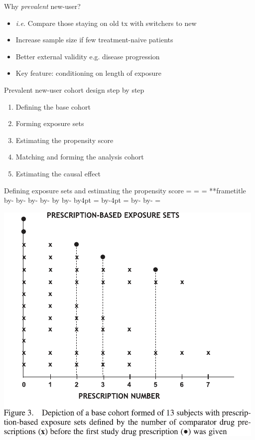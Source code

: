 \documentclass[aspectratio=169,12pt]{beamer} %
\makeatletter
\newif\ifsidebartheme
\newcommand*{\calculatespace}{%
    \contentheight=\paperheight%
    \ifx\beamer@frametitle\@empty%
        \setbox\@tempboxa=\box\voidb@x%
      \else%
        \setbox\@tempboxa=\vbox{%
          \vbox{}%
          {\parskip0pt\usebeamertemplate***{frametitle}}%
        }%
        \ifsidebartheme%
          \advance\contentheight by-1em%
        \fi%
      \fi%
    \advance\contentheight by-\ht\@tempboxa%
    \advance\contentheight by-\dp\@tempboxa%
    \advance\contentheight by-\beamer@frametopskip%
    \ifbeamer@plainframe%
    \contentbottom=0pt%
    \else%
    \advance\contentheight by-\headheight%
    \advance\contentheight by\headdp%
    \advance\contentheight by-\footheight%
    \advance\contentheight by4pt%
    \contentbottom=\footheight%
    \advance\contentbottom by-4pt%
    \fi%
    \contentwidth=\paperwidth%
    \ifbeamer@plainframe%
    \contentleft=0pt%
    \else%
    \advance\contentwidth by-\beamer@rightsidebar%
    \advance\contentwidth by-\beamer@leftsidebar\relax%
    \contentleft=\beamer@leftsidebar%
    \fi%
}
\makeatother
\begin{document}
\begin{frame}{Why \emph{prevalent} new-user?}
    \begin{itemize}
	\item \emph{i.e.} Compare those staying on old tx with switchers to new
	\item Increase sample size if few treatment-naive patients
	\item Better external validity e.g. disease progression
	\item Key feature: conditioning on length of exposure
    \end{itemize}
\end{frame}

\begin{frame}{Prevalent new-user cohort design step by step}
    \begin{enumerate}
	\item Defining the base cohort
	\item Forming exposure sets
	\item Estimating the propensity score
	\item Matching and forming the analysis cohort
	\item Estimating the causal effect
    \end{enumerate}
\end{frame}

\begin{frame}{Defining exposure sets and estimating the propensity score}
    \calculatespace%
    \begin{center}
	\includegraphics[height=0.85\contentheight]{ref/suimoodell-fig3.pdf}
    \end{center}

\end{frame}
\end{document}
